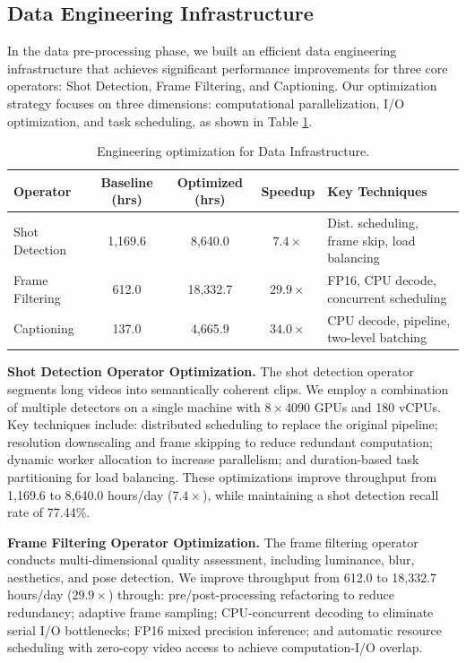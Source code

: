 \documentclass{llmxive}
\begin{document}
\subsection{Data Engineering Infrastructure} 
In the data pre-processing phase, we built an efficient data engineering infrastructure that achieves significant performance improvements for three core operators: Shot Detection, Frame Filtering, and Captioning. Our optimization strategy focuses on three dimensions: computational parallelization, I/O optimization, and task scheduling, as shown in Table \ref{tab:data_engineering}.

\begin{table}[!htbp]
\centering
\footnotesize
\begin{tabular}{lcccp{4.5cm}}
\toprule
\textbf{Operator} & \textbf{Baseline (hrs)} & \textbf{Optimized (hrs)} & \textbf{Speedup} & \textbf{Key Techniques} \\
\midrule
Shot Detection  & 1,169.6 & 8,640.0  & $7.4\times$  & Dist. scheduling, frame skip, load balancing \\
Frame Filtering & 612.0   & 18,332.7 & $29.9\times$ & FP16, CPU decode, concurrent scheduling \\
Captioning      & 137.0   & 4,665.9  & $34.0\times$ & CPU decode, pipeline, two-level batching \\
\bottomrule
\end{tabular}
\caption{Engineering optimization for Data Infrastructure.}
\label{tab:data_engineering}
\end{table}



\textbf{Shot Detection Operator Optimization.} The shot detection operator segments long videos into semantically coherent clips. We employ a combination of multiple detectors on a single machine with $8\times$4090 GPUs and 180 vCPUs. Key techniques include: distributed scheduling to replace the original pipeline; resolution downscaling and frame skipping to reduce redundant computation; dynamic worker allocation to increase parallelism; and duration-based task partitioning for load balancing. These optimizations improve throughput from 1,169.6 to 8,640.0 hours/day ($7.4\times$), while maintaining a shot detection recall rate of 77.44\%.

\textbf{Frame Filtering Operator Optimization.} The frame filtering operator conducts multi-dimensional quality assessment, including luminance, blur, aesthetics, and pose detection. We improve throughput from 612.0 to 18,332.7 hours/day ($29.9\times$) through: pre/post-processing refactoring to reduce redundancy; adaptive frame sampling; CPU-concurrent decoding to eliminate serial I/O bottlenecks; FP16 mixed precision inference; and automatic resource scheduling with zero-copy video access to achieve computation-I/O overlap.
\end{document}
